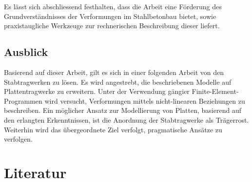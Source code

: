 \documentclass[
  12pt,
  letterpaper,
  egregdoesnotlikesansseriftitles]{scrreprt}
\begin{document}
Es lässt sich abschliessend festhalten, dass die Arbeit eine Förderung
des Grundverständnisses der Verformungen im Stahlbetonbau bietet, sowie
praxistaugliche Werkzeuge zur rechnerischen Beschreibung dieser liefert.

\hypertarget{ausblick}{%
\section{Ausblick}\label{ausblick}}

Basierend auf dieser Arbeit, gilt es sich in einer folgenden Arbeit von
den Stabtragwerken zu lösen. Es wird angestrebt, die beschriebenen
Modelle auf Plattentragwerke zu erweitern. Unter der Verwendung gängier
Finite-Element-Programmen wird versucht, Verformungen mittels
nicht-linearen Beziehungen zu beschreiben. Ein möglicher Ansatz zur
Modellierung von Platten, basierend auf den erlangten Erkenntnissen, ist
die Anordnung der Stabtragwerke als Trägerrost. Weiterhin wird das
übergeordnete Ziel verfolgt, pragmatische Ansätze zu verfolgen.


\hypertarget{literatur}{%
\chapter*{Literatur}\label{literatur}}

\end{document}
